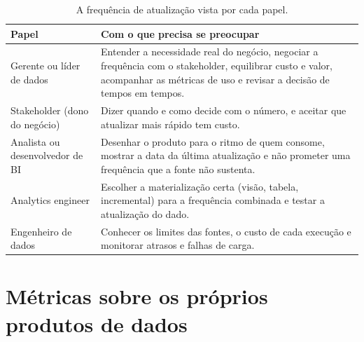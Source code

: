 \begin{table}[htbp]
  \centering
  \caption{A frequência de atualização vista por cada papel.}
  \label{tab:papeis-frequencia}
  \small
  \begin{tabularx}{\textwidth}{@{}>{\raggedright\arraybackslash}p{}
      >{\raggedright\arraybackslash}X@{}}
    \toprule
    Papel & Com o que precisa se preocupar \\
    \midrule
    Gerente ou líder de dados & Entender a necessidade real do negócio, negociar a
      frequência com o stakeholder, equilibrar custo e valor, acompanhar as métricas de
      uso e revisar a decisão de tempos em tempos. \\
    \addlinespace
    Stakeholder (dono do negócio) & Dizer quando e como decide com o número, e aceitar
      que atualizar mais rápido tem custo. \\
    \addlinespace
    Analista ou desenvolvedor de BI & Desenhar o produto para o ritmo de quem consome,
      mostrar a data da última atualização e não prometer uma frequência que a fonte não
      sustenta. \\
    \addlinespace
    Analytics engineer & Escolher a materialização certa (visão, tabela, incremental)
      para a frequência combinada e testar a atualização do dado. \\
    \addlinespace
    Engenheiro de dados & Conhecer os limites das fontes, o custo de cada execução e
      monitorar atrasos e falhas de carga. \\
    \bottomrule
  \end{tabularx}
\end{table}

\section{Métricas sobre os próprios produtos de dados}
\label{sec:metricas-uso}


